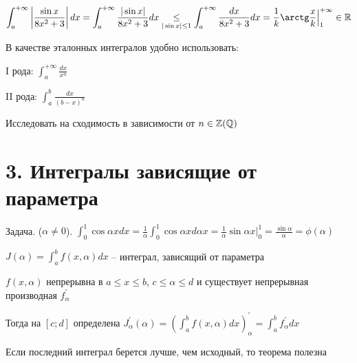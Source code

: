 \documentclass[12pt]{article}
\begin{document}
\begin{enumerate}[label*=\textbf{\arabic** }]
        $\displaystyle \int^{+\infty}_{a} \left|\frac{\sin x}{8x^2 + 3}\right| dx = \int^{+\infty}_{a} \frac{|\sin x|}{8x^2 + 3} dx \underset{|\sin x| \leq 1}{\leq} \int^{+\infty}_{a} \frac{dx}{8x^2 + 3} dx = \frac{1}{k} \arctg\frac{x}{k} \Big|^{+\infty}_{1} \in \Real$

        \mediumvspace

        В качестве эталонных интегралов удобно использовать:

        I рода: $\displaystyle \int^{+\infty}_{a} \frac{dx}{x^n}$

        II рода: $\displaystyle \int^{b}_{a} \frac{dx}{(b - x)^n}$

        \Lab Исследовать на сходимость в зависимости от $n \in \mathbb{Z} (\mathbb{Q})$
    \end{enumerate}
    
    \clearpage

    \section{3. Интегралы зависящие от параметра}

    Задача. \Exs ($\alpha \neq 0$). $\displaystyle \int^{1}_{0} \cos\alpha x dx = \frac{1}{\alpha} \int^{1}_{0} \cos\alpha x d\alpha x = \frac{1}{\alpha} \sin \alpha x \Big|^{1}_{0} = \frac{\sin\alpha}{\alpha} = \phi(\alpha)$

    $\displaystyle J(\alpha) = \int^b_a f(x, \alpha)dx$ -- интеграл, зависящий от параметра

    \begin{MyTheorem}
        $f(x, \alpha)$ непрерывна в $a \leq x \leq b$, $c \leq \alpha \leq d$ и существует непрерывная производная $f^\prime_\alpha$

        Тогда на $[c;d]$ определена $J^\prime_\alpha(\alpha) = \left(\int^b_a f(x, \alpha)dx\right)^\prime_\alpha = \int^b_a f^\prime_\alpha dx$
    \end{MyTheorem}

    Если последний интеграл берется лучше, чем исходный, то теорема полезна
\end{document}
